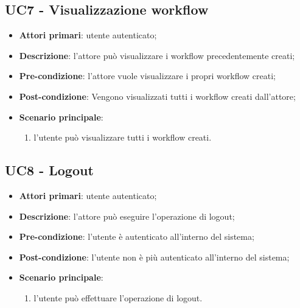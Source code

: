 \subsection{UC7 - Visualizzazione workflow}

\begin{itemize}
\item \textbf{Attori primari}: utente autenticato;

\item \textbf{Descrizione}:  l'attore può visualizzare i workflow precedentemente creati;

\item \textbf{Pre-condizione}: l'attore vuole visualizzare i propri workflow creati;

\item \textbf{Post-condizione}: Vengono visualizzati tutti i workflow creati dall'attore;

\item \textbf{Scenario principale}:
\begin{enumerate}
\item l'utente può visualizzare tutti i workflow creati.
\end{enumerate}
\end{itemize}

\subsection{UC8 - Logout}

\begin{itemize}
\item \textbf{Attori primari}: utente autenticato;

\item \textbf{Descrizione}: l'attore può eseguire l'operazione di logout;

\item \textbf{Pre-condizione}: l'utente è autenticato all'interno del sistema;

\item \textbf{Post-condizione}: l'utente non è più autenticato all'interno del sistema;

\item \textbf{Scenario principale}:
\begin{enumerate}
\item l'utente può effettuare l'operazione di logout.
\end{enumerate}
\end{itemize}
